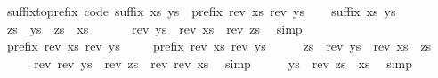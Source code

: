 \begin{isabellebody}
\isamarkupfalse%
%
\endisatagproof
{\isafoldproof}%
%
\isadelimproof
\isanewline
%
\endisadelimproof
\isanewline
{}\isamarkupfalse%
\ suffix{\isacharunderscore}to{\isacharunderscore}prefix\ {\isacharbrackleft}code{\isacharbrackright}{\isacharcolon}\ {\isachardoublequoteopen}suffix\ xs\ ys\ {\isasymlongleftrightarrow}\ prefix\ {\isacharparenleft}rev\ xs{\isacharparenright}\ {\isacharparenleft}rev\ ys{\isacharparenright}{\isachardoublequoteclose}\isanewline
%
\isadelimproof
%
\endisadelimproof
%
\isatagproof
{}\isamarkupfalse%
\isanewline
\ \ \isamarkupfalse%
\ {\isachardoublequoteopen}suffix\ xs\ ys{\isachardoublequoteclose}\isanewline
\ \ \isamarkupfalse%
\ \isamarkupfalse%
\ zs\ \ {\isachardoublequoteopen}ys\ {\isacharequal}\ zs\ {\isacharat}\ xs{\isachardoublequoteclose}\ \isacommand{{\isachardot}{\isachardot}}\isamarkupfalse%
\isanewline
\ \ \isamarkupfalse%
\ \isamarkupfalse%
\ {\isachardoublequoteopen}rev\ ys\ {\isacharequal}\ rev\ xs\ {\isacharat}\ rev\ zs{\isachardoublequoteclose}\ \isamarkupfalse%
\ simp\isanewline
\ \ \isamarkupfalse%
\ \isamarkupfalse%
\ {\isachardoublequoteopen}prefix\ {\isacharparenleft}rev\ xs{\isacharparenright}\ {\isacharparenleft}rev\ ys{\isacharparenright}{\isachardoublequoteclose}\ \isacommand{{\isachardot}{\isachardot}}\isamarkupfalse%
\isanewline
{}\isamarkupfalse%
\isanewline
\ \ \isamarkupfalse%
\ {\isachardoublequoteopen}prefix\ {\isacharparenleft}rev\ xs{\isacharparenright}\ {\isacharparenleft}rev\ ys{\isacharparenright}{\isachardoublequoteclose}\isanewline
\ \ \isamarkupfalse%
\ \isamarkupfalse%
\ zs\ \ {\isachardoublequoteopen}rev\ ys\ {\isacharequal}\ rev\ xs\ {\isacharat}\ zs{\isachardoublequoteclose}\ \isacommand{{\isachardot}{\isachardot}}\isamarkupfalse%
\isanewline
\ \ \isamarkupfalse%
\ \isamarkupfalse%
\ {\isachardoublequoteopen}rev\ {\isacharparenleft}rev\ ys{\isacharparenright}\ {\isacharequal}\ rev\ zs\ {\isacharat}\ rev\ {\isacharparenleft}rev\ xs{\isacharparenright}{\isachardoublequoteclose}\ \isamarkupfalse%
\ simp\isanewline
\ \ \isamarkupfalse%
\ \isamarkupfalse%
\ {\isachardoublequoteopen}ys\ {\isacharequal}\ rev\ zs\ {\isacharat}\ xs{\isachardoublequoteclose}\ \isamarkupfalse%
\ simp\isanewline
\ \ \isamarkupfalse%

\end{isabellebody}
